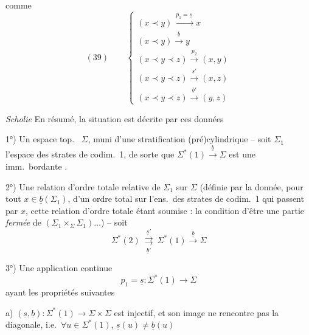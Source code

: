 \documentclass[11pt,a4paper]{article}
\begin{document}
comme
\[
(39)\qquad\left\lbrace
\begin{array}{l}
(x\prec y)\xrightarrow{\ p_1=\underline s\ }x\\
(x\prec y)\xrightarrow{\ \underline b\ }y\\
(x\prec y\prec z)\xrightarrow{\ p_2\ }(x,y)\\
(x\prec y\prec z)\xrightarrow{\ \underline s'\ }(x,z)\\
(x\prec y\prec z)\xrightarrow{\ \underline b'\ }(y,z)
\end{array}\right.
\]

\emph{Scholie} En résumé, la situation est décrite par ces données 

1°) Un espace top.\  $\Sigma$, muni d'une stratification (pré)cylindrique -- soit $\Sigma_1$ l'espace des strates de codim.\ 1, de sorte que $\Sigma^{*}(1)\xrightarrow{\ \underline b\ }\Sigma$ est une imm.\ bordante .

2°) Une relation d'ordre totale relative de $\Sigma_1$ sur $\Sigma$ (définie par la donnée, pour tout $x\in\underline b(\Sigma_1)$, d'un ordre total sur l'ens.\ des strates de codim.\ 1 qui passent par $x$, cette relation d'ordre totale étant soumise : la condition d'être  une partie \emph{fermée} de $(\Sigma_1\times_\Sigma\Sigma_1)\ldots$) -- soit
\[
\Sigma^{*}(2)\ \overset{\underline s'}{\underset{\underline b'}{\rightrightarrows}}\ \Sigma^{*}(1)\xrightarrow{\ \underline b\ }\Sigma
\]


3°) Une application continue
\[
p_1=\underline s : \Sigma^{*}(1)\longrightarrow\Sigma
\]
ayant les propriétés suivantes

a) $(\underline s,\underline b) : \Sigma^{*}(1)\longrightarrow\Sigma\times\Sigma$ est injectif, et son image ne rencontre pas la diagonale, i.e.\ $\forall u\in\Sigma^{*}(1)$, $\underline s(u)\neq\underline b(u)$
\end{document}
